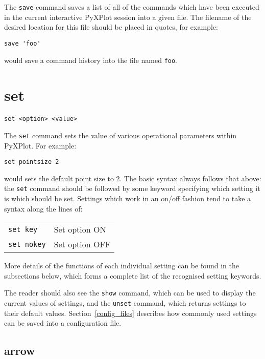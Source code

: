 The {\tt save} command saves a list of all of the commands which have been
executed in the current interactive PyXPlot session into a given file. The
filename of the desired location for this file should be placed in quotes, for
example:

\begin{verbatim}
save 'foo'
\end{verbatim}

\noindent would save a command history into the file named {\tt foo}.


\section{set}

\begin{verbatim}
set <option> <value>
\end{verbatim}

The {\tt set} command sets the value of various operational parameters within
PyXPlot.  For example:

\begin{verbatim}
set pointsize 2
\end{verbatim}

\noindent would sets the default point size to 2. The basic syntax always
follows that above: the {\tt set} command should be followed by some keyword
specifying which setting it is which should be set.  Settings which work in an
on/off fashion tend to take a syntax along the lines of:

\begin{tabular}{ll}
{\tt set key} & Set option ON \\
{\tt set nokey} & Set option OFF
\end{tabular}

\noindent
More details of the functions of each individual setting can be found in the
subsections below, which forms a complete list of the recognised setting
keywords.

The reader should also see the {\tt show} command, which can be used to display
the current values of settings, and the {\tt unset} command, which returns
settings to their default values. Section~\ref{config_files} describes how
commonly used settings can be saved into a configuration file.

\subsection{arrow}

